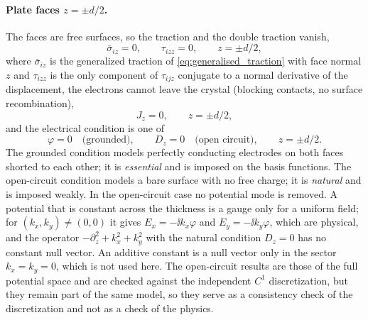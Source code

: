 \paragraph{Plate faces $z=\pm d/2$.}  The faces are free surfaces, so the
traction and the double traction vanish,
\begin{equation}
\label{eq:bc_faces_mech}
\bar\sigma_{iz}=0,\qquad \tau_{izz}=0,\qquad z=\pm d/2,
\end{equation}
where $\bar\sigma_{iz}$ is the generalized traction of \eqref{eq:generalised_traction}
with face normal $z$ and $\tau_{izz}$ is the only component of $\tau_{ijz}$ conjugate
to a normal derivative of the displacement,
the electrons cannot leave the crystal (blocking contacts, no surface
recombination),
\begin{equation}
\label{eq:bc_faces_carrier}
J_z=0,\qquad z=\pm d/2,
\end{equation}
and the electrical condition is one of
\begin{equation}
\label{eq:bc_grounded}
\varphi=0\quad\text{(grounded)},\qquad
D_z=0\quad\text{(open circuit)},\qquad z=\pm d/2 .
\end{equation}
The grounded condition models perfectly conducting electrodes on both faces
shorted to each other; it is \emph{essential} and is imposed on the basis
functions.  The open-circuit condition models a bare surface with no free
charge; it is \emph{natural} and is imposed weakly.  In the open-circuit case
no potential mode is removed.  A potential that is constant across the thickness is
a gauge only for a uniform field; for $(k_x,k_y)\neq(0,0)$ it gives
$E_x=-\ii k_x\varphi$ and $E_y=-\ii k_y\varphi$, which are physical, and the operator
$-\partial_z^{2}+k_x^{2}+k_y^{2}$ with the natural condition $D_z=0$ has no constant null vector.
An additive constant is a null vector only in the sector $k_x=k_y=0$, which is not
used here.  The open-circuit results are those of the full potential space and are checked
against the independent $C^{1}$ discretization, but they remain
part of the same model, so they serve as a consistency check of the discretization and not as a check of the physics.

